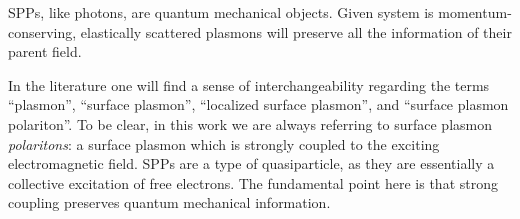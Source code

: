 SPPs, like photons, are quantum mechanical objects.  Given system is
momentum-conserving, elastically scattered plasmons will preserve all the
information of their parent field.  

In the literature one will find a sense of interchangeability regarding
the terms ``plasmon'', ``surface plasmon'', ``localized surface plasmon'',
and ``surface plasmon polariton''.  To be clear, in this work we are always
referring to surface plasmon \textit{polaritons}: a surface plasmon which is
strongly coupled to the exciting electromagnetic field.  SPPs are a type of
quasiparticle, as they are essentially a collective excitation of free
electrons.  The fundamental point here is that strong coupling preserves
quantum mechanical information.

%
%
%
